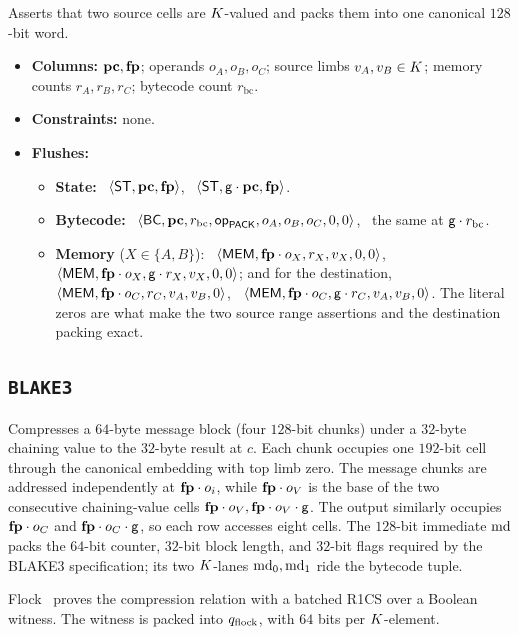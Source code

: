 Asserts that two source cells are $K$-valued and packs them into one canonical $128$-bit word.
\begin{itemize}
\item \textbf{Columns:} $\mathbf{pc},\mathbf{fp}$; operands $o_A,o_B,o_C$; source limbs $v_A,v_B\in K$; memory counts $r_A,r_B,r_C$; bytecode count $r_{\mathrm{bc}}$.
\item \textbf{Constraints:} none. 
\item \textbf{Flushes:}
  \begin{itemize}
  \item \textbf{State:} \pull\ $\langle \mathsf{ST},\mathbf{pc},\mathbf{fp} \rangle$, \push\ $\langle \mathsf{ST},\mathsf{g}\cdot\mathbf{pc},\mathbf{fp} \rangle$.
  \item \textbf{Bytecode:} \pull\ $\langle \mathsf{BC},\mathbf{pc},r_{\mathrm{bc}},\mathsf{op}_{\mathsf{PACK}},o_A,o_B,o_C,0,0 \rangle$, \push\ the same at $\mathsf{g}\cdot r_{\mathrm{bc}}$.
  \item \textbf{Memory} ($X\in\{A,B\}$): \pull\ $\langle \mathsf{MEM},\mathbf{fp}\cdot o_X,r_X,v_X,0,0 \rangle$, \push\ $\langle \mathsf{MEM},\mathbf{fp}\cdot o_X,\mathsf{g}\cdot r_X,v_X,0,0 \rangle$; and for the destination, \pull\ $\langle \mathsf{MEM},\mathbf{fp}\cdot o_C,r_C,v_A,v_B,0 \rangle$, \push\ $\langle \mathsf{MEM},\mathbf{fp}\cdot o_C,\mathsf{g}\cdot r_C,v_A,v_B,0 \rangle$. The literal zeros are what make the two source range assertions and the destination packing exact.
  \end{itemize}
\end{itemize}

\subsection{\texttt{BLAKE3}}\label{sec:tab-blake3}

Compresses a $64$-byte message block (four $128$-bit chunks) under a $32$-byte chaining value to the $32$-byte result at $c$. Each chunk occupies one $192$-bit cell through the canonical embedding with top limb zero. The message chunks are addressed independently at $\mathbf{fp}\cdot o_i$, while $\mathbf{fp}\cdot o_V$ is the base of the two consecutive chaining-value cells $\mathbf{fp}\cdot o_V,\mathbf{fp}\cdot o_V \cdot \mathsf{g}$. The output similarly occupies $\mathbf{fp}\cdot o_C$ and $\mathbf{fp}\cdot o_C \cdot \mathsf{g}$, so each row accesses eight cells. The $128$-bit immediate $\mathrm{md}$ packs the $64$-bit counter, $32$-bit block length, and $32$-bit flags required by the BLAKE3 specification; its two $K$-lanes $\mathrm{md}_0,\mathrm{md}_1$ ride the bytecode tuple.

Flock~\cite{flock-impl} proves the compression relation with a batched R1CS over a Boolean witness. The witness is packed into $q_{\mathrm{flock}}$, with $64$ bits per $K$-element.


